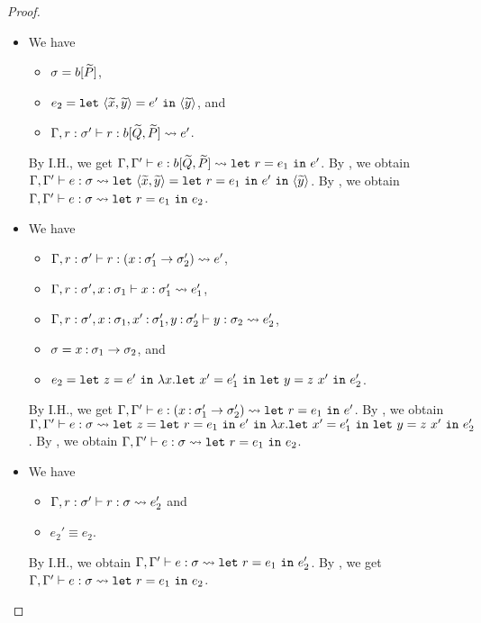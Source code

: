 \begin{proof}
\begin{itemize}
\item[] 
We have
\begin{itemize}
\item \(\sigma=b[\widetilde{P}]\),
\item \(e_2=\mathtt{let~}\langle{\widetilde{x},\widetilde{y}}\rangle=e'\mathtt{~in~}{\langle{\widetilde{y}}\rangle}\), and
\item \(\Gamma,r:\sigma' \vdash r : b[\widetilde{Q},\widetilde{P}] \leadsto e'\).
\end{itemize}
By I.H., we get
\(\Gamma,\Gamma' \vdash e : b[\widetilde{Q},\widetilde{P}] \leadsto \mathtt{let~}r=e_1\mathtt{~in~}{e'}\).
By , we obtain
\(\Gamma,\Gamma' \vdash e : \sigma \leadsto \mathtt{let~}\langle{\widetilde{x},\widetilde{y}}\rangle=\mathtt{let~}r=e_1\mathtt{~in~}{e'}\mathtt{~in~}{\langle{\widetilde{y}}\rangle}\).
By , we obtain
\(\Gamma,\Gamma' \vdash e : \sigma \leadsto \mathtt{let~}r=e_1\mathtt{~in~}e_2\).

\item[] 
We have
\begin{itemize}
\item \(\Gamma,r:\sigma' \vdash r : (x\mathbin{:}\sigma'_1\to\sigma'_2) \leadsto e'\),
\item \(\Gamma,r:\sigma',x\mathbin{:}\sigma_1 \vdash x : \sigma'_1 \leadsto e_1'\),
\item \(\Gamma,r:\sigma',x\mathbin{:}\sigma_1,x'\mathbin{:}\sigma'_1,y\mathbin{:}\sigma'_2 \vdash y : \sigma_2 \leadsto e_2'\),
\item \(\sigma=x\mathbin{:}\sigma_1\to\sigma_2\), and
\item \(e_2=\mathtt{let~}z=e'\mathtt{~in~}\lambda x.\mathtt{let~}x'=e_1'\mathtt{~in~}\mathtt{let~}y=z\ x'\mathtt{~in~}e_2'\).
\end{itemize}
By I.H., we get
\(\Gamma,\Gamma' \vdash e : (x\mathbin{:}\sigma'_1\to\sigma'_2) \leadsto \mathtt{let~}r=e_1\mathtt{~in~}{e'}\).
By , we obtain
\(\Gamma,\Gamma' \vdash e : \sigma \leadsto \mathtt{let~}z=\mathtt{let~}r=e_1\mathtt{~in~}{e'}\mathtt{~in~}\lambda x.\mathtt{let~}x'=e_1'\mathtt{~in~}\mathtt{let~}y=z\ x'\mathtt{~in~}e_2'\).
By , we obtain
\(\Gamma,\Gamma' \vdash e : \sigma \leadsto \mathtt{let~}r=e_1\mathtt{~in~}e_2\).

\item[] 
We have
\begin{itemize}
\item \(\Gamma,r:\sigma' \vdash r : \sigma \leadsto e_2'\) and
\item \(e_2' \equiv e_2\).
\end{itemize}
By I.H.,
we obtain \(\Gamma,\Gamma' \vdash e : \sigma \leadsto \mathtt{let~}r=e_1\mathtt{~in~}{e_2'}\).
By , we get
\(\Gamma,\Gamma' \vdash e : \sigma \leadsto \mathtt{let~}r=e_1\mathtt{~in~}{e_2}\).
\end{itemize}
\end{proof}

